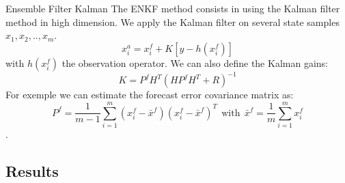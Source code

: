 \begin{frame}{Ensemble Filter Kalman}
    The ENKF method consists in using the Kalman filter method in high dimension.
    \newline We apply the Kalman filter on several state samples $x_1,x_2,..,x_{m}$.
    $$x_i^a=x_i^f+K[y-h(x_i^f)]$$
    with $h(x_i^f)$ the observation operator.
    We can also define the Kalman gains: 
    $$K=P^f H^T(HP^f H^T+R)^{-1}$$
    For exemple we can estimate the
    forecast error covariance matrix as:
    $$P^f=\frac{1}{m-1}\sum_{i=1}^{m}(x_i^f-\bar{x}^f)(x_i^f-\bar{x}^f)^T~~\text{with}~~\bar{x}^f=\frac{1}{m}\sum_{i=1}^{m}x_i^f $$ .
\end{frame}
\subsection{Results}

